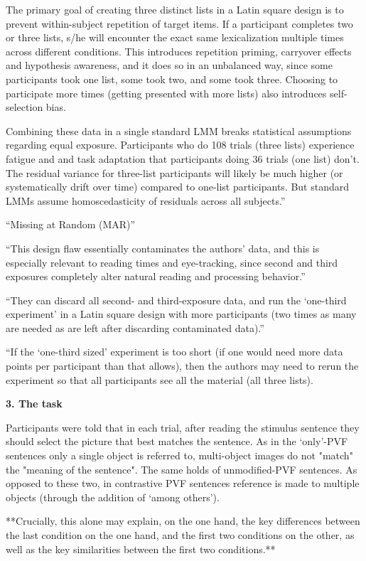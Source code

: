 \documentclass[a4paper, ruler]{CUP-JNL-LIN}%
\begin{document}
The primary goal of creating three distinct lists in a Latin square design is to prevent within-subject repetition of target items. If a participant completes two or three lists, s/he will encounter the exact same lexicalization multiple times across different conditions. This introduces repetition priming, carryover effects and hypothesis awareness, and it does so in an unbalanced way, since some participants took one list, some took two, and some took three. Choosing to participate more times (getting presented with more lists) also introduces self-selection bias.

Combining these data in a single standard LMM breaks statistical assumptions regarding equal exposure. Participants who do 108 trials (three lists) experience fatigue and
and task adaptation that participants doing 36 trials (one list) don't. The residual variance for three-list participants will likely be much higher (or systematically drift over time) compared to one-list participants. But standard LMMs assume homoscedasticity of residuals across all subjects.”

“Missing at Random (MAR)”

“This design flaw essentially contaminates the authors’ data, and this is especially relevant to reading times and eye-tracking, since second and third exposures completely alter natural reading and processing behavior.”

“They can discard all second- and third-exposure data, and run the ‘one-third experiment’ in a Latin square design with more participants (two times as many are needed as are left after discarding contaminated data).”

“If the ‘one-third sized’ experiment is too short (if one would need more data points per participant than that allows), then the authors may need to rerun the experiment so that all participants see all the material (all three lists).

\textbf{3. The task}

Participants were told that in each trial, after reading the stimulus sentence they should select the picture that best matches the sentence. As in the ‘only’-PVF sentences only a single object is referred to, multi-object images do not "match" the "meaning of the sentence". The same holds of unmodified-PVF sentences. As opposed to these two, in contrastive PVF sentences reference is made to multiple objects (through the addition of ‘among others’).

**Crucially, this alone may explain, on the one hand, the key differences between the last condition on the one hand, and the first two conditions on the other, as well as the key similarities between the first two conditions.**
\end{document}
